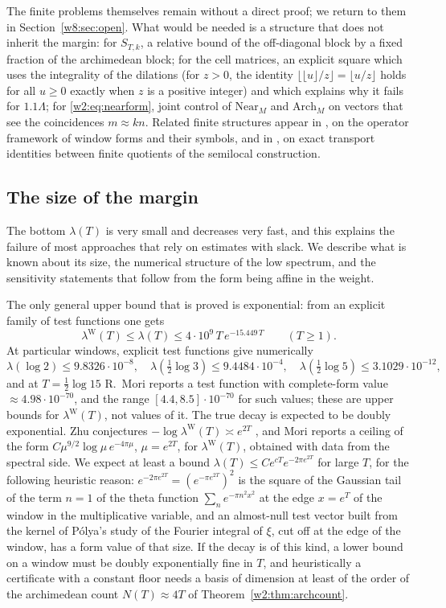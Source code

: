 \documentclass[11pt]{amsart}
\theoremstyle{definition}
\theoremstyle{remark}
\numberwithin{equation}{section}
\newcommand{\lam}{\lambda(T)}                          %
\newcommand{\lamW}{\lambda^{\mathrm W}(T)}             %
\begin{document}
The finite problems themselves remain without a direct proof; we return to them in Section~\ref{w8:sec:open}. What
would be needed is a structure that does not inherit the margin: for $S_{T,k}$, a relative bound of the off-diagonal
block by a fixed fraction of the archimedean block; for the cell matrices, an explicit square which uses the
integrality of the dilations (for $z>0$, the identity $\lfloor\lfloor u\rfloor/z\rfloor=\lfloor u/z\rfloor$ holds for
all $u\ge0$ exactly when $z$ is a positive integer) and which explains why it fails for $1.1\Lambda$; for
\eqref{w2:eq:nearform}, joint control of $\mathrm{Near}_M$ and $\mathrm{Arch}_M$ on vectors that see the coincidences
$m\approx kn$. Related finite structures appear in \cite{P26}, on the operator framework of window forms and their
symbols, and in \cite{P39}, on exact transport identities between finite quotients of the semilocal construction.

\subsection{The size of the margin}\label{w2:sec:margin}

The bottom $\lam$ is very small and decreases very fast, and this explains the failure of most approaches that rely on
estimates with slack. We describe what is known about its size, the numerical structure of the low spectrum, and the
sensitivity statements that follow from the form being affine in the weight.

The only general upper bound that is proved is exponential: from an explicit family of test functions one gets
\cite[Corollary~9.11]{P46}
\[
\lamW\le\lam\le4\cdot10^{9}\,T\,e^{-15.449\,T}\qquad(T\ge1).
\]
At particular windows, explicit test functions give numerically
\[
\lambda(\log2)\le9.8326\cdot10^{-8},\quad \lambda(\tfrac12\log3)\le9.4484\cdot10^{-4},\quad
\lambda(\tfrac12\log5)\le3.1029\cdot10^{-12},
\]
and at $T=\frac12\log15$ R.~Mori reports a test function with complete-form value $\approx4.98\cdot10^{-70}$, and the
range $[4.4,8.5]\cdot10^{-70}$ for such values; these are upper bounds for $\lamW$, not values of it. The true decay
is expected to be doubly exponential. Zhu conjectures $-\log\lamW\asymp e^{2T}$ \cite[Conjecture~12.1]{Zhu2026}, and
Mori \cite{MoriUpper} reports a ceiling of the form $C\mu^{9/2}\log\mu\,e^{-4\pi\mu}$, $\mu=e^{2T}$, for $\lamW$, obtained with data from
the spectral side. We expect at least a bound $\lam\le Ce^{cT}e^{-2\pi e^{2T}}$ for large $T$, for the following
heuristic reason: $e^{-2\pi e^{2T}}=(e^{-\pi e^{2T}})^2$ is the square of the Gaussian tail of the term $n=1$ of the
theta function $\sum_n e^{-\pi n^2x^2}$ at the edge $x=e^{T}$ of the window in the multiplicative variable, and an
almost-null test vector built from the kernel of P\'olya's study of the Fourier integral of $\xi$, cut off at the edge
of the window, has a form value of that size. If the decay is of this kind, a lower bound on a window must be
doubly exponentially fine in $T$, and heuristically a certificate with a constant floor needs a basis of dimension at
least of the order of the archimedean count $N(T)\approx4T$ of Theorem~\ref{w2:thm:archcount}.
\end{document}
